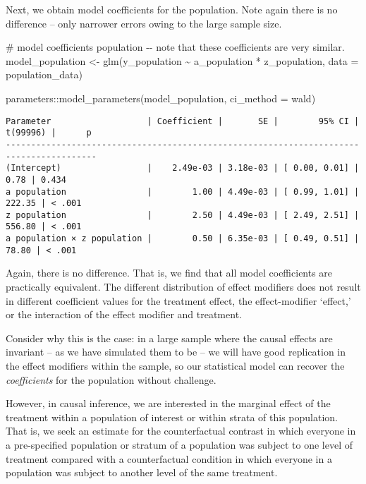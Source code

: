 \documentclass[
  single column]{article}
\newenvironment{Shaded}{\begin{snugshade}}{\end{snugshade}}
\newcommand{\AttributeTok}[1]{\textcolor[rgb]{0.40,0.45,0.13}{#1}}
\newcommand{\CommentTok}[1]{\textcolor[rgb]{0.37,0.37,0.37}{#1}}
\newcommand{\FunctionTok}[1]{\textcolor[rgb]{0.28,0.35,0.67}{#1}}
\newcommand{\NormalTok}[1]{\textcolor[rgb]{0.00,0.23,0.31}{#1}}
\newcommand{\OtherTok}[1]{\textcolor[rgb]{0.00,0.23,0.31}{#1}}
\newcommand{\SpecialCharTok}[1]{\textcolor[rgb]{0.37,0.37,0.37}{#1}}
\newcommand{\StringTok}[1]{\textcolor[rgb]{0.13,0.47,0.30}{#1}}
\begin{document}
Next, we obtain model coefficients for the population. Note again there
is no difference -- only narrower errors owing to the large sample size.

\begin{Shaded}
\begin{Highlighting}[]
\CommentTok{\# model coefficients population {-}{-} note that these coefficients are very similar. }
\NormalTok{model\_population }\OtherTok{\textless{}{-}} \FunctionTok{glm}\NormalTok{(y\_population }\SpecialCharTok{\textasciitilde{}}\NormalTok{ a\_population }\SpecialCharTok{*}\NormalTok{ z\_population, }
  \AttributeTok{data =}\NormalTok{ population\_data)}

\NormalTok{parameters}\SpecialCharTok{::}\FunctionTok{model\_parameters}\NormalTok{(model\_population, }\AttributeTok{ci\_method =} \StringTok{\textquotesingle{}wald\textquotesingle{}}\NormalTok{)}
\end{Highlighting}
\end{Shaded}

\begin{verbatim}
Parameter                   | Coefficient |       SE |        95% CI | t(99996) |      p
----------------------------------------------------------------------------------------
(Intercept)                 |    2.49e-03 | 3.18e-03 | [ 0.00, 0.01] |     0.78 | 0.434 
a population                |        1.00 | 4.49e-03 | [ 0.99, 1.01] |   222.35 | < .001
z population                |        2.50 | 4.49e-03 | [ 2.49, 2.51] |   556.80 | < .001
a population × z population |        0.50 | 6.35e-03 | [ 0.49, 0.51] |    78.80 | < .001
\end{verbatim}

Again, there is no difference. That is, we find that all model
coefficients are practically equivalent. The different distribution of
effect modifiers does not result in different coefficient values for the
treatment effect, the effect-modifier `effect,' or the interaction of
the effect modifier and treatment.

Consider why this is the case: in a large sample where the causal
effects are invariant -- as we have simulated them to be -- we will have
good replication in the effect modifiers within the sample, so our
statistical model can recover the \emph{coefficients} for the population
without challenge.

However, in causal inference, we are interested in the marginal effect
of the treatment within a population of interest or within strata of
this population. That is, we seek an estimate for the counterfactual
contrast in which everyone in a pre-specified population or stratum of a
population was subject to one level of treatment compared with a
counterfactual condition in which everyone in a population was subject
to another level of the same treatment.
\end{document}
